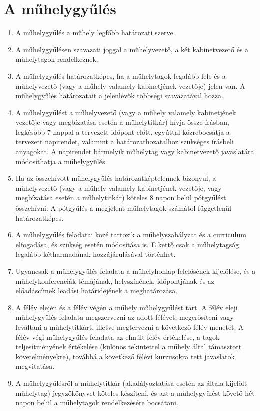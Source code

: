\documentclass{rulebook}
\begin{document}
\section{A műhelygyűlés}

\begin{enumerate}
	\item A műhelygyűlés a műhely legfőbb határozati szerve.
	\item A műhelygyűlésen szavazati joggal a műhelyvezető, a két kabinetvezető és a műhelytagok rendelkeznek.
	\item A műhelygyűlés határozatképes, ha a műhelytagok legalább fele és a műhelyvezető (vagy a műhely valamely kabinetjének vezetője) jelen van. A műhelygyűlés határozatait a jelenlévők többségi szavazatával hozza.
	\item A műhelygyűlést a műhelyvezető (vagy a műhely valamely kabinetjének vezetője vagy megbízatása esetén a műhelytitkár) hívja össze írásban, legkésőbb 7 nappal a tervezett időpont előtt, egyúttal közrebocsátja a tervezett napirendet, valamint a határozathozatalhoz szükséges	írásbeli anyagokat. A napirendet bármelyik műhelytag vagy kabinetvezető javaslatára módosíthatja a műhelygyűlés.
	\item Ha az összehívott műhelygyűlés határozatképtelennek bizonyul, a műhelyvezető (vagy a műhely valamely kabinetjének vezetője, vagy megbízatása esetén a műhelytitkár) köteles 8 napon belül pótgyűlést összehívni. A pótgyűlés a megjelent műhelytagok számától függetlenül határozatképes.
	\item A műhelygyűlés feladatai közé tartozik a műhelyszabályzat és a curriculum elfogadása, és szükség esetén módosítása is. E kettő csak a műhelytagság legalább kétharmadának hozzájárulásával történhet.
	\item Ugyancsak a műhelygyűlés feladata a műhelyhonlap felelősének kijelölése, és a műhelykonferenciák témájának, helyszínének, időpontjának és az előadáscímek leadási határidejének a meghatározása.
	\item A félév elején és a félév végén a műhely műhelygyűlést tart. A félév eleji műhelygyűlés feladata megszervezni az adott félévet, megerősíteni vagy leváltani a műhelytitkárt, illetve megtervezni a következő félév menetét. A félév végi műhelygyűlés feladata az elmúlt félév értékelése, a tagok teljesítményének értékelése (különös tekintettel a műhely által támasztott követelményekre), továbbá a következő félévi kurzusokra tett javaslatok megvitatása.
	\item A műhelygyűlésről a műhelytitkár (akadályoztatása esetén az általa kijelölt műhelytag) jegyzőkönyvet köteles készíteni, és azt a műhelygyűlést követő hét napon belül a műhelytagok rendelkezésére bocsátani.
\end{enumerate}
\end{document}

